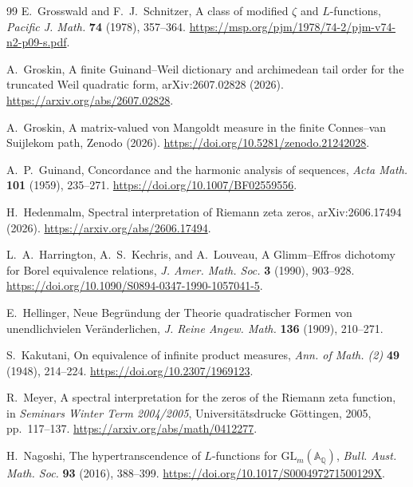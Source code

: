 \documentclass[11pt]{article}
\theoremstyle{definition}
\theoremstyle{remark}
\begin{document}
\begin{thebibliography}{99}
E.~Grosswald and F.~J.~Schnitzer,
\newblock A class of modified \(\zeta\) and \(L\)-functions,
\newblock \emph{Pacific J. Math.} \textbf{74} (1978), 357--364.
\newblock \url{https://msp.org/pjm/1978/74-2/pjm-v74-n2-p09-s.pdf}.

A.~Groskin,
\newblock A finite Guinand--Weil dictionary and archimedean tail order for the truncated Weil
quadratic form,
\newblock arXiv:2607.02828 (2026).
\newblock \url{https://arxiv.org/abs/2607.02828}.

A.~Groskin,
\newblock A matrix-valued von Mangoldt measure in the finite Connes--van Suijlekom path,
\newblock Zenodo (2026).
\newblock \url{https://doi.org/10.5281/zenodo.21242028}.

A.~P.~Guinand,
\newblock Concordance and the harmonic analysis of sequences,
\newblock \emph{Acta Math.} \textbf{101} (1959), 235--271.
\newblock \url{https://doi.org/10.1007/BF02559556}.

H.~Hedenmalm,
\newblock Spectral interpretation of Riemann zeta zeros,
\newblock arXiv:2606.17494 (2026).
\newblock \url{https://arxiv.org/abs/2606.17494}.

L.~A.~Harrington, A.~S.~Kechris, and A.~Louveau,
\newblock A Glimm--Effros dichotomy for Borel equivalence relations,
\newblock \emph{J. Amer. Math. Soc.} \textbf{3} (1990), 903--928.
\newblock \url{https://doi.org/10.1090/S0894-0347-1990-1057041-5}.

E.~Hellinger,
\newblock Neue Begr\"undung der Theorie quadratischer Formen von unendlichvielen
Ver\"anderlichen,
\newblock \emph{J. Reine Angew. Math.} \textbf{136} (1909), 210--271.

S.~Kakutani,
\newblock On equivalence of infinite product measures,
\newblock \emph{Ann. of Math. (2)} \textbf{49} (1948), 214--224.
\newblock \url{https://doi.org/10.2307/1969123}.

R.~Meyer,
\newblock A spectral interpretation for the zeros of the Riemann zeta function,
\newblock in \emph{Seminars Winter Term 2004/2005}, Universit\"atsdrucke G\"ottingen,
2005, pp.~117--137.
\newblock \url{https://arxiv.org/abs/math/0412277}.

H.~Nagoshi,
\newblock The hypertranscendence of \(L\)-functions for
\(\mathrm{GL}_m(\mathbb A_{\mathbb Q})\),
\newblock \emph{Bull. Aust. Math. Soc.} \textbf{93} (2016), 388--399.
\newblock \url{https://doi.org/10.1017/S000497271500129X}.


\end{thebibliography}
\end{document}
